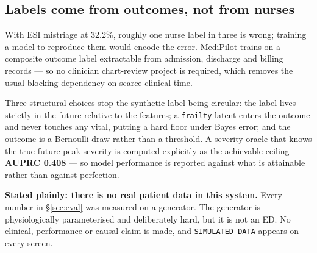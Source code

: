 \documentclass[10pt,a4paper,twocolumn]{article}
\newcommand{\cm}[1]{\texttt{#1}}
\begin{document}
\subsection{Labels come from outcomes, not from nurses}
With ESI mistriage at 32.2\%, roughly one nurse label in three is wrong; training a model to
reproduce them would encode the error. MediPilot trains on a composite outcome label extractable
from admission, discharge and billing records --- so no clinician chart-review project is required,
which removes the usual blocking dependency on scarce clinical time.

Three structural choices stop the synthetic label being circular: the label lives strictly in the
future relative to the features; a \cm{frailty} latent enters the outcome and never touches any
vital, putting a hard floor under Bayes error; and the outcome is a Bernoulli draw rather than a
threshold. A severity oracle that knows the true future peak severity is computed explicitly as
the achievable ceiling --- \textbf{AUPRC 0.408} --- so model performance is reported against what is
attainable rather than against perfection.

\begin{tcolorbox}[mpwarn]
\textbf{Stated plainly: there is no real patient data in this system.} Every number in
\S\ref{sec:eval} was measured on a generator. The generator is physiologically parameterised and
deliberately hard, but it is not an ED. No clinical, performance or causal claim is made, and
\cm{SIMULATED DATA} appears on every screen.
\end{tcolorbox}
\end{document}

